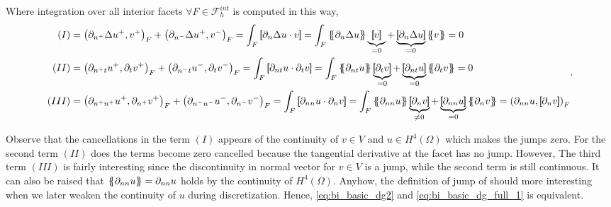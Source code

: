 Where integration over all interior facets $ \forall F \in \mathcal{F}_{h}^{int}$ is computed in this way,
\begin{equation*}
    \begin{split}
        (I) &  =    \left(\partial _{n^{+}} \Delta  u^{+} ,v^{+}\right)_{F} +
        \left(\partial _{n^{-}} \Delta  u^{+} ,v^{-}\right)_{F} =   \int_{F}^{}
        \jump{ \partial _{n} \Delta  u \cdot v } =
         \int_{F}^{}
         \mean{ \partial _{n} \Delta  u } \underbrace{\jump{ v }}_{= 0}    + \underbrace{\jump{ \partial _{n} \Delta  u
         }}_{= 0}    \mean{ v } = 0 \\
        (II) &  =     \left(\partial _{n^{+}t} u^{+}, \partial_{t} v^{+}
        \right)_{F} +  \left(\partial _{n^{-}t} u^{-}, \partial_{t} v^{-}
\right)_{F}    =   \int_{F}^{}
        \jump{ \partial _{nt} u \cdot  \partial_{t} v } =
         \int_{F}^{}
         \mean{ \partial _{nt} u    } \underbrace{\jump{ \partial_{t} v }  }_{= 0}    + \underbrace{\jump{ \partial
                 _{nt}  u
         }}_{= 0}    \mean{ \partial _{t}v }  = 0\\
        (III) &  =     \left(\partial _{n^{+}n^{+}} u^{+}, \partial_{n^{+}} v^{+} \right)_{F} +  \left(\partial _{n^{-}n^{-}} u^{-}, \partial_{n^{-}} v^{-} \right)_{F}    =    \int_{F}^{} \jump{ \partial _{nn} u \cdot  \partial_{n} v } = \int_{F}^{}
        \mean{ \partial _{nn} u    } \underbrace{\jump{ \partial_{n} v }  }_{\neq 0}    + \underbrace{\jump{ \partial
                 _{nn}  u
         }}_{= 0}    \mean{ \partial _{n}v } =
        \left( \partial _{nn} u    , \jump{ \partial_{n} v } \right)_{F}  \\
    \end{split}
.\end{equation*}

Observe that the cancellations in the term $(I)$ appears of the continuity of $v\in V $ and $u\in H^{4}\left( \Omega  \right) $ which makes the jumps zero. For the second term $(II)$ does the terms become zero cancelled because the tangential
derivative at the facet has no jump. However, The third term $(III)$  is fairly interesting since the discontinuity in normal vector for $v \in V$ is a jump, while the second term is still continuous. It can also be raised that $\left\{\!\!\left\{ \partial _{nn} u \right\}\!\!\right\} = \partial _{nn} u  $ holds by the continuity of $H^{4}\left( \Omega  \right) $. Anyhow, the definition of jump of should more interesting when we later weaken the continuity of $u$ during discretization.
Hence, \eqref{eq:bi_basic_dg2} and \eqref{eq:bi_basic_dg_full_1} is equivalent.

